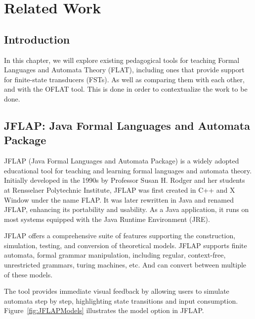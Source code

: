 
%

\chapter{Related Work}
\label{cha:related_work}

\section{Introduction}
In this chapter, we will explore existing pedagogical tools for teaching Formal Languages and Automata Theory (FLAT), 
including ones that provide support for finite-state transducers (FSTs). As well as comparing them with each other, and with the OFLAT tool. 
This is done in order to contextualize the work to be done.

\section{JFLAP: Java Formal Languages and Automata Package}

JFLAP (Java Formal Languages and Automata Package)\cite{JFLAP} is a widely adopted educational tool for teaching and learning formal languages and automata theory. 
Initially developed in the 1990s by Professor Susan H. Rodger and her students at Rensselaer Polytechnic Institute, JFLAP was first created in C++ and X Window under the name FLAP. 
It was later rewritten in Java and renamed JFLAP, enhancing its portability and usability. As a Java application, it runs on most systems equipped with the Java Runtime Environment (JRE).

JFLAP offers a comprehensive suite of features supporting the construction, simulation, testing, and conversion of theoretical models. 
JFLAP supports finite automata, formal grammar manipulation, including regular, context-free, unrestricted grammars, turing machines, etc. 
And can convert between multiple of these models.

The tool provides immediate visual feedback by allowing users to simulate automata step by step, highlighting state transitions and input consumption. 
Figure~\ref{fig:JFLAPModels} illustrates the model option in JFLAP.

